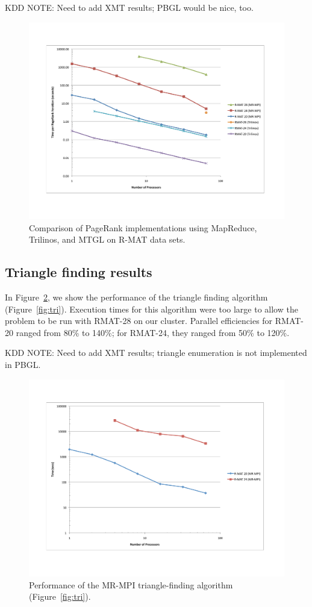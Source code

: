 KDD NOTE:  Need to add XMT results; PBGL would be nice, too.


\begin{figure}[htb]
\includegraphics[width=\textwidth]{fig_pagerank.pdf}
\caption{Comparison of PageRank implementations using MapReduce,
Trilinos, and MTGL on R-MAT data sets.}
\label{f:pr}
\end{figure}


\subsection{Triangle finding results}

In Figure~\ref{f:tri}, we show the performance of the triangle finding 
algorithm (Figure~\ref{fig:tri}).  Execution times for this algorithm were
too large to allow the problem to be run with RMAT-28 on our cluster.
Parallel efficiencies for RMAT-20 ranged from 80\% to 140\%; for RMAT-24, they
ranged from 50\% to 120\%.

KDD NOTE:  Need to add XMT results; triangle enumeration is not implemented in PBGL.

\begin{figure}[htb]
\includegraphics[width=\textwidth]{fig_tri.pdf}
\caption{Performance of the MR-MPI triangle-finding algorithm (Figure~\ref{fig:tri}).}
\label{f:tri}
\end{figure}

